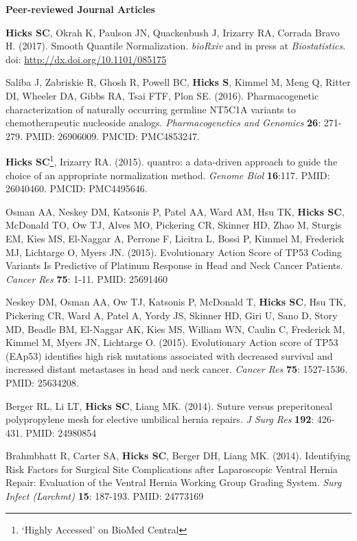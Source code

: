 \documentclass[10pt]{article}
\begin{document}
\textbf{Peer-reviewed Journal Articles}
\begin{enumerate}[label= {[\arabic*]}]
\item {\bf Hicks SC}, Okrah K, Paulson JN, Quackenbush J, Irizarry RA, Corrada Bravo H. (2017). Smooth Quantile Normalization. {\it bioRxiv} and in press at {\it Biostatistics}. doi: \url{http://dx.doi.org/10.1101/085175} 
\item Saliba J, Zabriskie R, Ghosh R, Powell BC, {\bf Hicks S}, Kimmel M, Meng Q, Ritter DI, Wheeler DA, Gibbs RA, Tsai FTF, Plon SE. (2016). Pharmacogenetic characterization of naturally occurring germline NT5C1A variants to chemotherapeutic nucleoside analogs. {\it Pharmacogenetics and Genomics}  {\bf 26}: 271-279. PMID: 26906009. PMCID: PMC4853247. 
\item {\bf Hicks SC}\footnote{ `Highly Accessed' on BioMed Central}, Irizarry RA. (2015). quantro: a data-driven approach to guide the choice of an appropriate normalization method. {\it Genome Biol} {\bf 16}:117. PMID: 26040460. PMCID: PMC4495646. 
\item Osman AA, Neskey DM, Katsonis P, Patel AA, Ward AM, Hsu TK, {\bf Hicks SC}, McDonald TO, Ow TJ, Alves MO, Pickering CR, Skinner HD, Zhao M, Sturgis EM, Kies MS, El-Naggar A, Perrone F, Licitra L, Bossi P, Kimmel M, Frederick MJ, Lichtarge O, Myers JN. (2015). Evolutionary Action Score of TP53 Coding Variants Is Predictive of Platinum Response in Head and Neck Cancer Patients. {\it Cancer Res} {\bf 75}: 1-11. PMID: 25691460
\item Neskey DM, Osman AA, Ow TJ, Katsonis P, McDonald T, {\bf Hicks SC}, Hsu TK, Pickering CR, Ward A, Patel A, Yordy JS, Skinner HD, Giri U, Sano D, Story MD, Beadle BM, El-Naggar AK, Kies MS, William WN, Caulin C, Frederick M, Kimmel M, Myers JN, Lichtarge O. (2015). Evolutionary Action score of TP53 (EAp53) identifies high risk mutations associated with decreased survival and increased distant metastases in head and neck cancer. {\it Cancer Res} {\bf 75}: 1527-1536. PMID: 25634208.
\item Berger RL, Li LT, {\bf Hicks SC}, Liang MK. (2014). Suture versus preperitoneal polypropylene mesh for elective umbilical hernia repairs. {\it J Surg Res} {\bf 192}: 426-431. PMID: 24980854 
\item Brahmbhatt R, Carter SA, {\bf Hicks SC}, Berger DH, Liang MK. (2014). Identifying Risk Factors for Surgical Site Complications after Laparoscopic Ventral Hernia Repair: Evaluation of the Ventral Hernia Working Group Grading System. {\it Surg Infect (Larchmt)} {\bf 15}: 187-193. PMID: 24773169

\end{enumerate}
\end{document}
